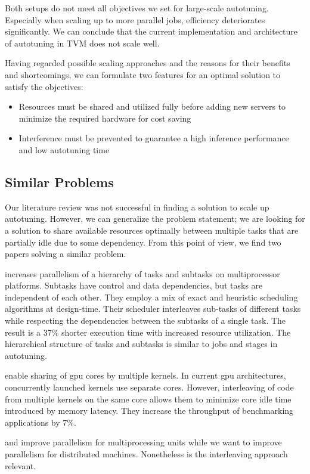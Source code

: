 Both setups do not meet all objectives we set for large-scale autotuning. Especially when scaling up to more parallel jobs, efficiency deteriorates significantly. We can conclude that the current implementation and architecture of autotuning in TVM does not scale well.

Having regarded possible scaling approaches and the reasons for their benefits and shortcomings, we can formulate two features for an optimal solution to satisfy the objectives:
\begin{itemize}
	\item Resources must be shared and utilized fully before adding new servers to minimize the required hardware for cost saving
	\item Interference must be prevented to guarantee a high inference performance and low autotuning time
\end{itemize}

\subsection{Similar Problems}
Our literature review was not successful in finding a solution to scale up autotuning. However, we can generalize the problem statement; we are looking for a solution to share available resources optimally between multiple tasks that are partially idle due to some dependency. From this point of view, we find two papers solving a similar problem.

\cite{Ma.2005} increases parallelism of a hierarchy of tasks and subtasks on multiprocessor platforms. Subtasks have control and data dependencies, but tasks are independent of each other. They employ a mix of exact and heuristic scheduling algorithms at design-time. Their scheduler interleaves sub-tasks of different tasks while respecting the dependencies between the subtasks of a single task. The result is a 37\% shorter execution time with increased resource utilization. The hierarchical structure of tasks and subtasks is similar to jobs and stages in autotuning.

\cite{Awatramani.2013} enable sharing of \gls{gpu} cores by multiple kernels. In current \gls{gpu} architectures, concurrently launched kernels use separate cores. However, interleaving of code from multiple kernels on the same core allows them to minimize core idle time introduced by memory latency. They increase the throughput of benchmarking applications by 7\%.

\cite{Ma.2005} and \cite{Awatramani.2013} improve parallelism for multiprocessing units while we want to improve parallelism for distributed machines. Nonetheless is the interleaving approach relevant.